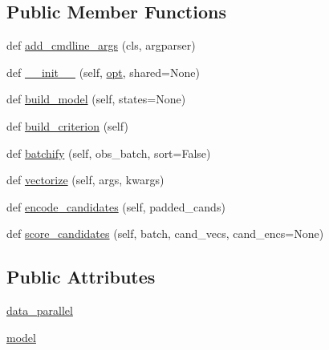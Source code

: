 \subsection*{Public Member Functions}
\begin{DoxyCompactItemize}
\item 
def \hyperlink{classparlai_1_1agents_1_1transformer_1_1transformer_1_1TransformerRankerAgent_a6836668a4c2394d7217631fed533a7ac}{add\+\_\+cmdline\+\_\+args} (cls, argparser)
\item 
def \hyperlink{classparlai_1_1agents_1_1transformer_1_1transformer_1_1TransformerRankerAgent_a677c14e106614404f5c5f8605b90ce3e}{\+\_\+\+\_\+init\+\_\+\+\_\+} (self, \hyperlink{classparlai_1_1core_1_1torch__agent_1_1TorchAgent_a785bb920cf8c8afc3e9bf6a8b77e335a}{opt}, shared=None)
\item 
def \hyperlink{classparlai_1_1agents_1_1transformer_1_1transformer_1_1TransformerRankerAgent_a3336fdab2d667e6e631135ec70e8558f}{build\+\_\+model} (self, states=None)
\item 
def \hyperlink{classparlai_1_1agents_1_1transformer_1_1transformer_1_1TransformerRankerAgent_af91ef63ee5c7f7588a75e32587364c80}{build\+\_\+criterion} (self)
\item 
def \hyperlink{classparlai_1_1agents_1_1transformer_1_1transformer_1_1TransformerRankerAgent_a2592aa2dc8469ab671656597b4ba48a8}{batchify} (self, obs\+\_\+batch, sort=False)
\item 
def \hyperlink{classparlai_1_1agents_1_1transformer_1_1transformer_1_1TransformerRankerAgent_a76ba1a57647f32877fce85a064952c5d}{vectorize} (self, args, kwargs)
\item 
def \hyperlink{classparlai_1_1agents_1_1transformer_1_1transformer_1_1TransformerRankerAgent_a6067345dff7fefda2809ea3bd63cd8fd}{encode\+\_\+candidates} (self, padded\+\_\+cands)
\item 
def \hyperlink{classparlai_1_1agents_1_1transformer_1_1transformer_1_1TransformerRankerAgent_af1af764f534c04a7bc98f11b3fe8f6ca}{score\+\_\+candidates} (self, batch, cand\+\_\+vecs, cand\+\_\+encs=None)
\end{DoxyCompactItemize}
\subsection*{Public Attributes}
\begin{DoxyCompactItemize}
\item 
\hyperlink{classparlai_1_1agents_1_1transformer_1_1transformer_1_1TransformerRankerAgent_a1698ffc6dff7a16e6ea4835b1463266c}{data\+\_\+parallel}
\item 
\hyperlink{classparlai_1_1agents_1_1transformer_1_1transformer_1_1TransformerRankerAgent_a0c4c885014349e9a9b07da029b211be4}{model}
\end{DoxyCompactItemize}

